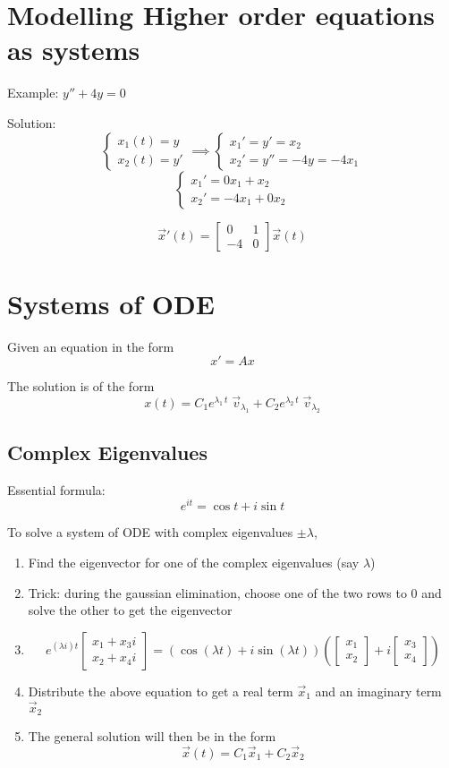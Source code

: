 \documentclass[12pt]{article}
\begin{document}
\section{Modelling Higher order equations as systems}
Example: $y'' + 4y = 0$

Solution:
\[\begin{cases}
    x_1(t) = y\\
    x_2(t) = y'
\end{cases} \implies \begin{cases}
    x_1' = y' = x_2\\
    x_2' = y'' = -4y = -4x_1
\end{cases}\] 
\[\begin{cases}
    x_1' = 0x_1 + x_2\\
    x_2' = -4x_1 + 0x_2
\end{cases}\]

\[\vec{x}'(t) = \begin{bmatrix}
    0 & 1\\
    -4 & 0
\end{bmatrix} \vec{x}(t)\]

\section{Systems of ODE}
Given an equation in the form 
\[x' = Ax\]

The solution is of the form
\[\boxed{x(t) = C_1 e^{\lambda_1 \, t}\; \vec{v}_{\lambda_1} + C_2 e^{\lambda_2\, t}\; \vec{v}_{\lambda_2}}\]

\subsection*{Complex Eigenvalues}
Essential formula:
\[e^{it} = \cos t + i \sin t\]

To solve a system of ODE with complex eigenvalues $\pm  \lambda$,
\begin{enumerate}
    \item Find the eigenvector for one of the complex eigenvalues (say $\lambda$)
    \item Trick: during the gaussian elimination, choose one of the two rows to 0 and solve the other to get the eigenvector 
    \item \[e^{(\lambda i)t} \begin{bmatrix}
        x_1 + x_3 i\\
        x_2 + x_4 i
    \end{bmatrix} = (\cos (\lambda t) + i \sin (\lambda t))\left(\begin{bmatrix}
        x_1\\x_2
    \end{bmatrix} + i \begin{bmatrix}
        x_3\\x_4
    \end{bmatrix}\right)\]
    \item Distribute the above equation to get a real term $\vec{x}_1$ and an imaginary term $\vec{x}_2$
    \item The general solution will then be in the form 
    \[\boxed{\vec{x}(t) = C_1 \vec{x}_1 + C_2 \vec{x}_2}\]
\end{enumerate}
\end{document}
